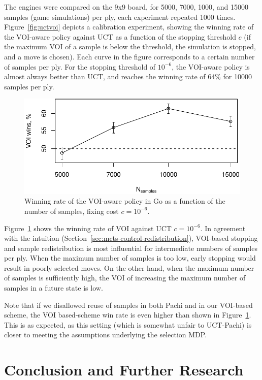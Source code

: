 The engines were compared on the 9x9 board, for 5000, 7000, 1000, and
15000 samples (game simulations) per ply, each experiment repeated
1000 times. Figure~\ref{fig:uctvoi} depicts a calibration experiment,
showing the winning rate of the VOI-aware policy against UCT as a function of
the stopping threshold $c$ (if the maximum VOI of a sample is below
the threshold, the simulation is stopped, and a move is chosen). Each
curve in the figure corresponds to a certain number of samples per
ply.  For the stopping threshold of $10^{-6}$, the VOI-aware policy
is almost always better than UCT, and reaches the winning rate of
64\% for 10000 samples per ply.

\begin{figure}[h!]
\centering
\includegraphics[scale=0.55]{mcts-voi-wins.pdf}
\caption{Winning rate of the VOI-aware policy in Go as a function of the number of samples, fixing cost $c=10^{-6}$.}
\label{fig:voi-wins}
\end{figure}

Figure~\ref{fig:voi-wins}
shows the winning rate of VOI against UCT $c=10^{-6}$. In agreement with the intuition
(Section~\ref{sec:mcts-control-redistribution}), VOI-based stopping and
sample redistribution is most influential for intermediate numbers of
samples per ply. When the maximum number of samples is too low, early
stopping would result in poorly selected moves. On the other hand,
when the maximum number of samples is sufficiently high, the VOI of
increasing the maximum number of samples in a future state is low.

Note that if we disallowed reuse of samples in both Pachi and
in our VOI-based scheme, the VOI based-scheme
win rate is even higher than shown in Figure~\ref{fig:voi-wins}. This is as expected,
as this setting (which is somewhat unfair to UCT-Pachi) is closer to
meeting the assumptions underlying the selection MDP.

\section{Conclusion and Further Research}

